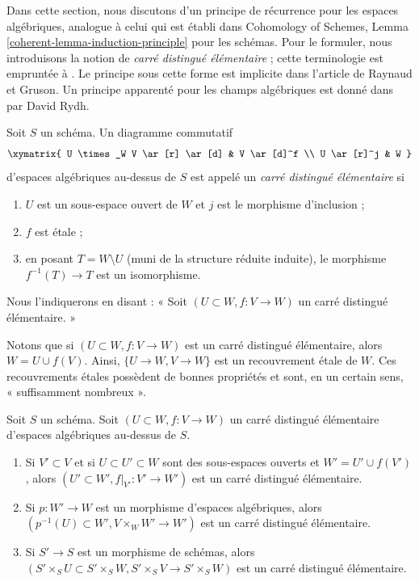 \noindent
Dans cette section, nous discutons d'un principe de récurrence pour les espaces algébriques,
analogue à celui qui est établi dans
Cohomology of Schemes, Lemma \ref{coherent-lemma-induction-principle}
pour les schémas. Pour le formuler, nous introduisons la notion de
{\it carré distingué élémentaire} ; cette terminologie est empruntée
à \cite{MV}.
Le principe sous cette forme est implicite dans l'article \cite{GruRay}
de Raynaud et Gruson.
Un principe apparenté pour les champs algébriques est donné dans
\cite[Théorème D]{rydh_etale_devissage} par David Rydh.

\begin{definition}
\label{definition-elementary-distinguished-square}
Soit $S$ un schéma. Un diagramme commutatif
$$
\xymatrix{
U \times_W V \ar[r] \ar[d] & V \ar[d]^f \\
U \ar[r]^j & W
}
$$
d'espaces algébriques au-dessus de $S$ est appelé un {\it carré distingué élémentaire}
si
\begin{enumerate}
\item $U$ est un sous-espace ouvert de $W$ et $j$ est le morphisme d'inclusion ;
\item $f$ est étale ;
\item en posant $T = W \setminus U$ (muni de la structure réduite induite),
le morphisme $f^{-1}(T) \to T$ est un isomorphisme.
\end{enumerate}
Nous l'indiquerons en disant : « Soit $(U \subset W, f : V \to W)$
un carré distingué élémentaire. »
\end{definition}

\noindent
Notons que si $(U \subset W, f : V \to W)$ est un carré distingué
élémentaire, alors $W = U \cup f(V)$. Ainsi, $\{U \to W, V \to W\}$ est
un recouvrement étale de $W$. Ces recouvrements étales possèdent
de bonnes propriétés et sont, en un certain sens,
« suffisamment nombreux ».

\begin{lemma}
\label{lemma-make-more-elementary-distinguished-squares}
Soit $S$ un schéma. Soit $(U \subset W, f : V \to W)$ un carré
distingué élémentaire d'espaces algébriques au-dessus de $S$.
\begin{enumerate}
\item Si $V' \subset V$ et si
$U \subset U' \subset W$ sont des sous-espaces ouverts et $W' = U' \cup f(V')$,
alors $(U' \subset W', f|_{V'} : V' \to W')$ est un carré distingué
élémentaire.
\item Si $p : W' \to W$ est un morphisme d'espaces algébriques, alors
$(p^{-1}(U) \subset W', V \times_W W' \to W')$ est un carré distingué
élémentaire.
\item Si $S' \to S$ est un morphisme de schémas, alors
$(S' \times_S U \subset S' \times_S W, S' \times_S V \to S' \times_S W)$
est un carré distingué élémentaire.
\end{enumerate}
\end{lemma}

